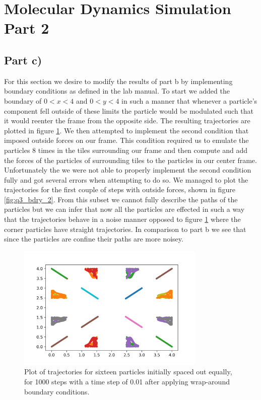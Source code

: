 \documentclass{article}
\begin{document}
\section{Molecular Dynamics Simulation Part 2}

\subsection{Part c)}
For this section we desire to modify the results of part b by implementing boundary conditions as defined in the lab manual. To start we added the boundary of $0<x<4$ and $0<y<4$ in such a manner that whenever a particle's component fell outside of these limits the particle would be modulated such that it would reenter the frame from the opposite side. The resulting trajectories are plotted in figure \ref{fig:q3_bdry}. We then attempted to implement the second condition that imposed outside forces on our frame. This condition required us to emulate the particles 8 times in the tiles surrounding our frame and then compute and add the forces of the particles of surrounding tiles to the particles in our center frame. Unfortunately the we were not able to properly implement the second condition fully and got several errors when attempting to do so. We managed to plot the trajectories for the first couple of steps with outside forces, shown in figure \ref{fig:q3_bdry_2}. From this subset we cannot fully describe the paths of the particles but we can infer that now all the particles are effected in such a way that the trajectories behave in a noise manner opposed to figure \ref{fig:q3_bdry} where the corner particles have straight trajectories. In comparison to part b we see that since the particles are confine their paths are more noisey.

\begin{figure}[H]
	\centering
	\includegraphics[width=0.8\textwidth]{../images/bdry.png}
	\caption{Plot of trajectories for sixteen particles initially spaced out equally, for 1000 steps with a time step of 0.01 after applying wrap-around boundary conditions.}
	\label{fig:q3_bdry}
\end{figure}
\end{document}
